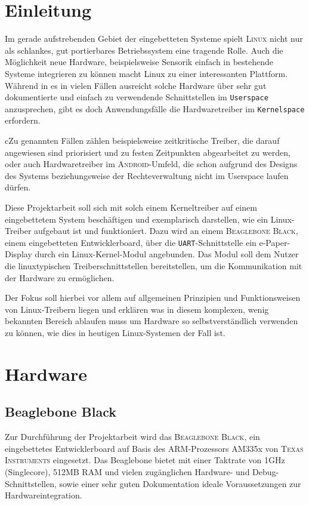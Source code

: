 
\chapter{Einleitung}
Im gerade aufstrebenden Gebiet der eingebetteten Systeme spielt \textsc{Linux} nicht nur als schlankes, gut portierbares Betriebssystem eine tragende Rolle. Auch die Möglichkeit neue Hardware, beispielsweise Sensorik einfach in bestehende Systeme integrieren zu können macht Linux zu einer interessanten Plattform. 
Während in es in vielen Fällen ausreicht solche Hardware über sehr gut dokumentierte und einfach zu verwendende Schnittstellen im \texttt{Userspace} anzusprechen, gibt es doch Anwendungsfälle die Hardwaretreiber im \texttt{Kernelspace} erfordern. 

cZu genannten Fällen zählen beispielsweise zeitkritische Treiber, die darauf angewiesen sind priorisiert und zu festen Zeitpunkten abgearbeitet zu werden, oder auch Hardwaretreiber im \textsc{Android}-Umfeld, die schon aufgrund des Designs des Systems beziehungsweise der Rechteverwaltung nicht im Userspace laufen dürfen. \newline

Diese Projektarbeit soll sich mit solch einem Kerneltreiber auf einem eingebettetem System beschäftigen und exemplarisch darstellen, wie ein Linux-Treiber aufgebaut ist und funktioniert. Dazu wird an einem \textsc{Beaglebone Black}, einem eingebetteten Entwicklerboard, über die \texttt{UART}-Schnittstelle ein e-Paper-Display durch ein Linux-Kernel-Modul angebunden. Das Modul soll dem Nutzer die linuxtypischen Treiberschnittstellen bereitstellen, um die Kommunikation mit der Hardware zu ermöglichen.

Der Fokus soll hierbei vor allem auf allgemeinen Prinzipien und Funktionsweisen von Linux-Treibern liegen und erklären was in diesem komplexen, wenig bekannten Bereich ablaufen muss um Hardware so selbstverständlich verwenden zu können, wie dies in heutigen Linux-Systemen der Fall ist. 

\chapter{Hardware}

\section{Beaglebone Black}
Zur Durchführung der Projektarbeit wird das \textsc{Beaglebone Black}, ein eingebettetes Entwicklerboard auf Basis des ARM-Prozessors AM335x von \textsc{Texas Instruments} eingesetzt. Das Beaglebone bietet mit einer Taktrate von 1GHz (Singlecore), 512MB RAM und vielen zugänglichen Hardware- und Debug-Schnittstellen, sowie einer sehr guten Dokumentation ideale Voraussetzungen zur Hardwareintegration. 


